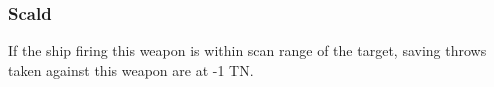 \subsubsection{Scald}
If the ship firing this weapon is within scan range of the target, saving throws taken against this weapon are at -1 TN.